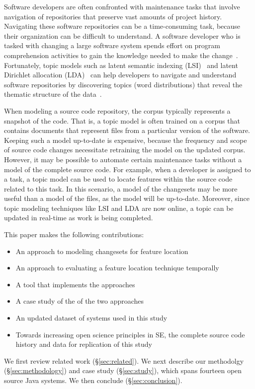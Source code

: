 %

Software developers are often confronted with maintenance tasks that involve navigation of repositories that preserve vast amounts of project history.
Navigating these software repositories can be a time-consuming task, because their organization can be difficult to understand.
A software developer who is tasked with changing a large software system spends effort on program comprehension activities to gain the knowledge needed to make the change~\cite{Corbi:1989}.
Fortunately, topic models such as
latent semantic indexing (LSI)~\cite{Deerwester:1990} and
latent Dirichlet allocation (LDA)~\cite{Blei-etal:2003}
can help developers to navigate and understand software repositories
by discovering topics (word distributions) that reveal the thematic structure of the data~\cite{Linstead-etal:2007,Thomas-etal:2011,Hindle_etal:2012}.


When modeling a source code repository, the corpus typically represents a snapshot of the code.
That is, a topic model is often trained on a corpus that contains documents that represent files from a particular version of the software.
Keeping such a model up-to-date is expensive, because the frequency and scope of source code changes necessitate retraining the model on the updated corpus.
However, it may be possible to automate certain maintenance tasks without a model of the complete source code.
For example, when a developer is assigned to a task, a topic model can be used to locate features within the source code related to this task.
In this scenario, a model of the changesets may be more useful than a model of the files, as the model will be up-to-date.
Moreover, since topic modeling techniques like LSI and LDA are now online, a topic can be updated in real-time as work is being completed.

This paper makes the following contributions:

\begin{itemize}
    \item An approach to modeling changesets for feature location
    \item An approach to evaluating a feature location technique temporally
    \item A tool that implements the approaches
    \item A case study of the of the two approaches
    \item An updated dataset of systems used in this study
    \item Towards increasing open science principles in SE,
        the complete source code history and data for replication of this study
\end{itemize}

We first review related work (\S\ref{sec:related}).
We next describe our methodolgy (\S\ref{sec:methodology}) and case study (\S\ref{sec:study}),
which spans fourteen open source Java systems. %
We then conclude (\S\ref{sec:conclusion}).
